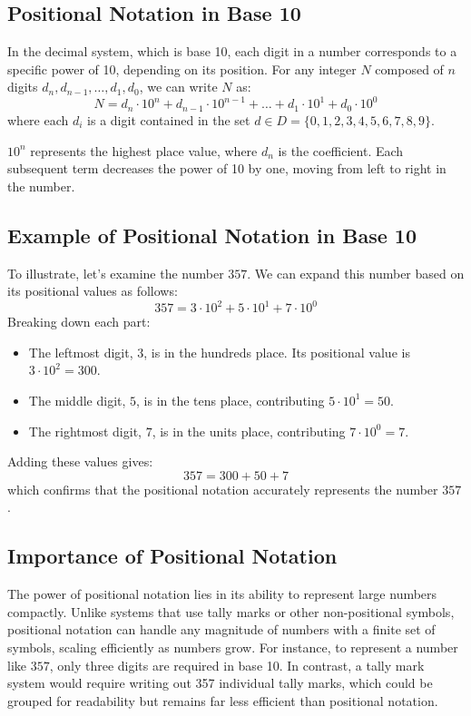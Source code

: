 \subsection{Positional Notation in Base 10}

In the decimal system, which is base 10, each digit in a number corresponds to a specific power of 10, depending on its position. For any integer \( N \) composed of \( n \) digits \( d_n, d_{n-1}, \ldots, d_1, d_0 \), we can write \( N \) as:
\[
N = d_n \cdot 10^n + d_{n-1} \cdot 10^{n-1} + \ldots + d_1 \cdot 10^1 + d_0 \cdot 10^0
\]
where each \( d_i \) is a digit contained in the set \(d \in D = \{0, 1, 2, 3, 4, 5, 6, 7, 8, 9\}
 \). 
 \vspace{\baselineskip}\par
 \( 10^n \) represents the highest place value, where \( d_n \) is the coefficient.
Each subsequent term decreases the power of 10 by one, moving from left to right in the number.

\subsection{Example of Positional Notation in Base 10}

To illustrate, let’s examine the number \( 357 \). We can expand this number based on its positional values as follows:
\[
357 = 3 \cdot 10^2 + 5 \cdot 10^1 + 7 \cdot 10^0
\]
Breaking down each part:
\begin{itemize}
    \item The leftmost digit, \( 3 \), is in the hundreds place. Its positional value is \( 3 \cdot 10^2 = 300 \).
    \item The middle digit, \( 5 \), is in the tens place, contributing \( 5 \cdot 10^1 = 50 \).
    \item The rightmost digit, \( 7 \), is in the units place, contributing \( 7 \cdot 10^0 = 7 \).
\end{itemize}
Adding these values gives:
\[
357 = 300 + 50 + 7
\]
which confirms that the positional notation accurately represents the number \( 357 \).

\subsection{Importance of Positional Notation}
The power of positional notation lies in its ability to represent large numbers compactly. Unlike systems that use tally marks or other non-positional symbols, positional notation can handle any magnitude of numbers with a finite set of symbols, scaling efficiently as numbers grow. For instance, to represent a number like \( 357 \), only three digits are required in base 10. In contrast, a tally mark system would require writing out 357 individual tally marks, which could be grouped for readability but remains far less efficient than positional notation.

